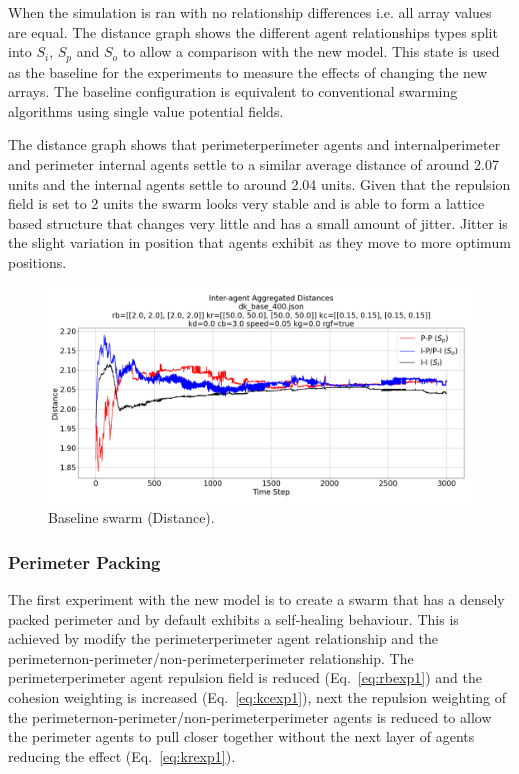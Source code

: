 \documentclass[12pt,a4paper]{IEEEtran}
\begin{document}
When the simulation is ran with no relationship differences i.e. all array values are equal. The distance graph shows the different agent relationships types split into $S_{i}$, $S_{p}$ and $S_{o}$ to allow a comparison with the new model. This state is used as the baseline for the experiments to measure the effects of changing the new arrays. The baseline configuration is equivalent to conventional swarming algorithms using single value potential fields.

The distance graph shows that perimeter\textrightarrow perimeter agents and internal\textrightarrow perimeter and perimeter \textrightarrow internal agents settle to a similar average distance of around 2.07 units and the internal agents settle to around 2.04 units. Given that the repulsion field is set to 2 units the swarm looks very stable and is able to form a lattice based structure that changes very little and has a small amount of jitter. Jitter is the slight variation in position that agents exhibit as they move to more optimum positions.

\begin{figure}[H]
	\begin{center}
		\includegraphics[width=1.0\linewidth]{figures/baselineDistance}
	\end{center}
	\caption{Baseline swarm (Distance). \label{fig:baselineDistance}}
\end{figure}

\subsubsection{Perimeter Packing}\label{sec:perimCompress}

The first experiment with the new model is to create a swarm that has a densely packed perimeter and by default exhibits a self-healing behaviour. This is achieved by modify the perimeter\textrightarrow perimeter agent relationship and the perimeter\textrightarrow non-perimeter/non-perimeter\textrightarrow perimeter relationship. The perimeter\textrightarrow perimeter agent repulsion field is reduced (Eq.~\ref{eq:rbexp1}) and the cohesion weighting is increased (Eq.~\ref{eq:kcexp1}), next the repulsion weighting of the perimeter\textrightarrow non-perimeter/non-perimeter\textrightarrow perimeter agents is reduced to allow the perimeter agents to pull closer together without the next layer of agents reducing the effect (Eq.~\ref{eq:krexp1}). 
\end{document}
